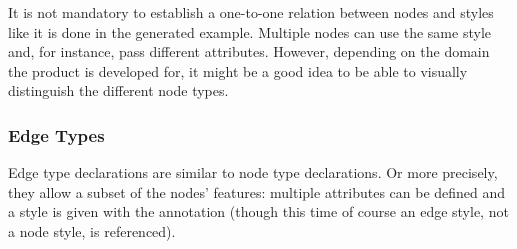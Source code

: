 \documentclass[a4paper,american,12pt]{scrreprt}
\begin{document}
It is not mandatory to establish a one-to-one relation between nodes and styles
like it is done in the generated example. Multiple nodes can use the same style 
and, for instance, pass different attributes. However, depending on the domain
the \cinco product is developed for, it might be a good idea to be able to
visually distinguish the different node types.


\subsubsection{Edge Types}

Edge type declarations are similar to node type declarations. Or more precisely,
they allow a subset of the nodes' features: multiple attributes can be defined
and a style is given with the  annotation (though this time of
course an edge style, not a node style, is referenced).
\end{document}
